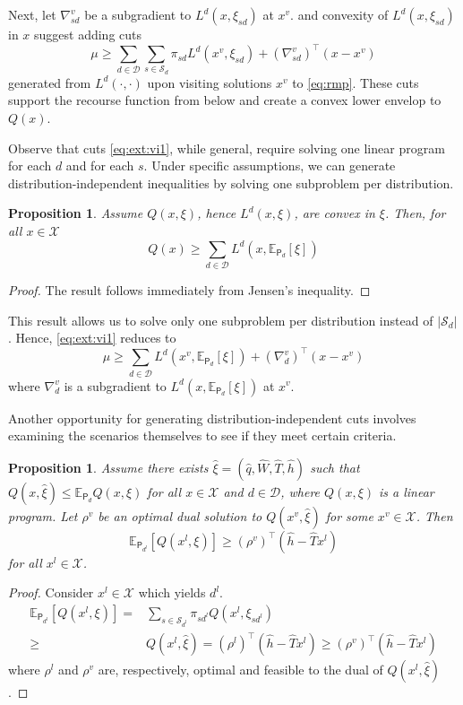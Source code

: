 \documentclass[12pt]{article}
\newtheorem{proposition}[theorem]{Proposition}%
\theoremstyle{thmstylethree}%
\newcommand{\mtc}[1] {\mathcal{#1}}
\newcommand{\pr}[1]{\ensuremath{\mathsf{#1}}}
\def\Ex{\ensuremath{\mathbb{E}}}
\begin{document}
Next, let $\nabla^v_{sd}$ be a subgradient to $L^d(x,\xi_{sd})$ at $x^v$.  and convexity of $L^d(x,\xi_{sd})$ in $x$ suggest adding cuts 
\begin{equation}\label{eq:ext:vi1}
  \mu\geq \sum_{d\in\mtc{D}}\sum_{s\in\mtc{S}_d}\pi_{sd}L^d(x^v,\xi_{sd})+(\nabla^v_{sd})^\top(x-x^v)
\end{equation}
generated from $L^{d}(\cdot,\cdot)$ upon visiting solutions $x^v$ to \eqref{eq:rmp}.
These cuts support the recourse function from below and create a convex lower envelop to $Q(x).$ %


Observe that cuts \eqref{eq:ext:vi1}, while general, require solving one linear program for each $d$ and for each $s$.
Under specific assumptions, we can generate distribution-independent inequalities by solving one subproblem per distribution.
\begin{proposition}\label{prop:evproblem}
  Assume $Q(x,\xi)$, hence $L^d(x,\xi)$, are convex in $\xi$. Then, for all $x\in\mtc{X}$
$$Q(x)\geq \sum_{d\in\mtc{D}}L^{d}(x,\Ex_{\pr{P}_d}[\xi])$$
\end{proposition}  
\begin{proof}
  The result follows immediately from Jensen's inequality.
  \end{proof}  

This result allows us to solve only one subproblem per distribution instead of $\vert \mtc{S}_d\vert$.
Hence, \eqref{eq:ext:vi1} reduces to
\begin{equation}\label{eq:ext:vi1conv}
  \mu\geq \sum_{d\in\mtc{D}}L^d(x^v,\Ex_{\pr{P}_d}[\xi])+(\nabla^v_{d})^\top(x-x^v)
\end{equation}
where $\nabla^v_{d}$ is a subgradient to $L^d(x,\Ex_{\pr{P}_d}[\xi])$ at $x^v$.



Another opportunity for generating distribution-independent cuts involves examining the scenarios themselves to see if they meet certain criteria. 
\begin{proposition}\label{prop:lowerenvelop}
  Assume there exists $\hat{\xi}=(\hat{q},\hat{W},\hat{T},\hat{h})$ such that $Q(x,\hat{\xi})\leq \Ex_{\pr{P}_d}Q(x,\xi)$ for all $x\in\mtc{X}$ and $d\in\mtc{D}$, where $Q(x,\xi)$ is a linear program.
  Let $\rho^v$ be an optimal dual solution to $Q(x^v,\hat{\xi})$ for some $x^v\in\mtc{X}$. Then
  $$\Ex_{\pr{P}_{d^l}}[Q(x^l,\xi)]\geq (\rho^v)^\top(\hat{h}-\hat{T}x^l)$$
  for all $x^l\in \mtc{X}$.
  \end{proposition}
  \begin{proof}
    Consider $x^l\in\mtc{X}$ which yields $d^l$.
    \begin{align*}
      \Ex_{\pr{P}_{d^l}}[Q(x^l,\xi)]=& \sum_{s\in\mtc{S}_{d^l}}\pi_{sd^l}Q(x^l,\xi_{sd^l})\\
      \geq &Q(x^l,\hat{\xi})=(\rho^l)^\top(\hat{h}-\hat{T}x^l) \geq (\rho^v)^\top(\hat{h}-\hat{T}x^l)
    \end{align*}
    where $\rho^l$ and $\rho^v$ are, respectively, optimal and feasible to the dual of $Q(x^l,\hat{\xi})$. 
  \end{proof}  
\end{document}
